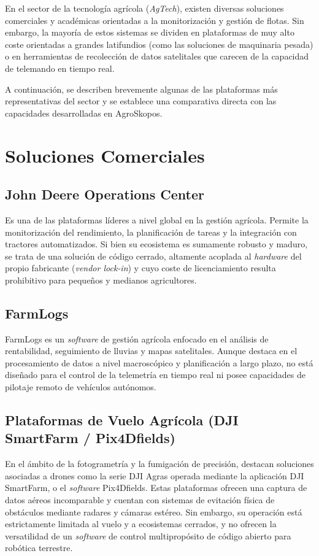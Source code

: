 
En el sector de la tecnología agrícola (\textit{AgTech}), existen diversas soluciones comerciales y académicas orientadas a la monitorización y gestión de flotas. Sin embargo, la mayoría de estos sistemas se dividen en plataformas de muy alto coste orientadas a grandes latifundios (como las soluciones de maquinaria pesada) o en herramientas de recolección de datos satelitales que carecen de la capacidad de telemando en tiempo real. 

A continuación, se describen brevemente algunas de las plataformas más representativas del sector y se establece una comparativa directa con las capacidades desarrolladas en AgroSkopos.

\section{Soluciones Comerciales}

\subsection{John Deere Operations Center}
Es una de las plataformas líderes a nivel global en la gestión agrícola. Permite la monitorización del rendimiento, la planificación de tareas y la integración con tractores automatizados. Si bien su ecosistema es sumamente robusto y maduro, se trata de una solución de código cerrado, altamente acoplada al \textit{hardware} del propio fabricante (\textit{vendor lock-in}) y cuyo coste de licenciamiento resulta prohibitivo para pequeños y medianos agricultores.

\subsection{FarmLogs}
FarmLogs es un \textit{software} de gestión agrícola enfocado en el análisis de rentabilidad, seguimiento de lluvias y mapas satelitales. Aunque destaca en el procesamiento de datos a nivel macroscópico y planificación a largo plazo, no está diseñado para el control de la telemetría en tiempo real ni posee capacidades de pilotaje remoto de vehículos autónomos.

\subsection{Plataformas de Vuelo Agrícola (DJI SmartFarm / Pix4Dfields)}
En el ámbito de la fotogrametría y la fumigación de precisión, destacan soluciones asociadas a drones como la serie DJI Agras operada mediante la aplicación DJI SmartFarm, o el \textit{software} Pix4Dfields. Estas plataformas ofrecen una captura de datos aéreos incomparable y cuentan con sistemas de evitación física de obstáculos mediante radares y cámaras estéreo. Sin embargo, su operación está estrictamente limitada al vuelo y a ecosistemas cerrados, y no ofrecen la versatilidad de un \textit{software} de control multipropósito de código abierto para robótica terrestre.

